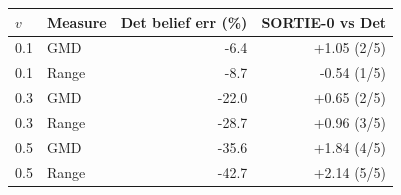 \begin{tabular}{llrr}\toprule
$v$ & Measure & Det belief err (\%) & SORTIE-0 vs Det \\
\midrule
0.1 & GMD & -6.4 & +1.05 (2/5) \\
0.1 & Range & -8.7 & -0.54 (1/5) \\
0.3 & GMD & -22.0 & +0.65 (2/5) \\
0.3 & Range & -28.7 & +0.96 (3/5) \\
0.5 & GMD & -35.6 & +1.84 (4/5) \\
0.5 & Range & -42.7 & +2.14 (5/5) \\
\bottomrule
\end{tabular}
